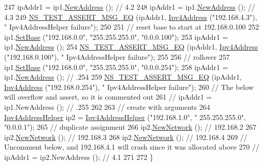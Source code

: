 \begin{DoxyCode}
247   ipAddr1 = ip1.\hyperlink{classns3_1_1Ipv4AddressHelper_a9d6bc3cd8def204f9c253fce666b2edd}{NewAddress} (); \textcolor{comment}{// 4.2}
248   ipAddr1 = ip1.\hyperlink{classns3_1_1Ipv4AddressHelper_a9d6bc3cd8def204f9c253fce666b2edd}{NewAddress} (); \textcolor{comment}{// 4.3}
249   \hyperlink{group__testing_ga2a9d78cffb3db8e867c35fff0b698cf5}{NS\_TEST\_ASSERT\_MSG\_EQ} (ipAddr1, \hyperlink{classns3_1_1Ipv4Address}{Ipv4Address} (\textcolor{stringliteral}{"192.168.4.3"}), \textcolor{stringliteral}{"
      Ipv4AddressHelper failure"});
250 
251   \textcolor{comment}{// reset base to start at 192.168.0.100}
252   ip1.\hyperlink{classns3_1_1Ipv4AddressHelper_acf7b16dd25bac67e00f5e25f90a9a035}{SetBase} (\textcolor{stringliteral}{"192.168.0.0"}, \textcolor{stringliteral}{"255.255.255.0"}, \textcolor{stringliteral}{"0.0.0.100"});
253   ipAddr1 = ip1.\hyperlink{classns3_1_1Ipv4AddressHelper_a9d6bc3cd8def204f9c253fce666b2edd}{NewAddress} ();
254   \hyperlink{group__testing_ga2a9d78cffb3db8e867c35fff0b698cf5}{NS\_TEST\_ASSERT\_MSG\_EQ} (ipAddr1, \hyperlink{classns3_1_1Ipv4Address}{Ipv4Address} (\textcolor{stringliteral}{"192.168.0.100"}), \textcolor{stringliteral}{"
      Ipv4AddressHelper failure"});
255   
256   \textcolor{comment}{// rollover}
257   ip1.\hyperlink{classns3_1_1Ipv4AddressHelper_acf7b16dd25bac67e00f5e25f90a9a035}{SetBase} (\textcolor{stringliteral}{"192.168.0.0"}, \textcolor{stringliteral}{"255.255.255.0"}, \textcolor{stringliteral}{"0.0.0.254"});
258   ipAddr1 = ip1.\hyperlink{classns3_1_1Ipv4AddressHelper_a9d6bc3cd8def204f9c253fce666b2edd}{NewAddress} (); \textcolor{comment}{// .254}
259   \hyperlink{group__testing_ga2a9d78cffb3db8e867c35fff0b698cf5}{NS\_TEST\_ASSERT\_MSG\_EQ} (ipAddr1, \hyperlink{classns3_1_1Ipv4Address}{Ipv4Address} (\textcolor{stringliteral}{"192.168.0.254"}), \textcolor{stringliteral}{"
      Ipv4AddressHelper failure"});
260   \textcolor{comment}{// The below will overflow and assert, so it is commented out}
261   \textcolor{comment}{// ipAddr1 = ip1.NewAddress (); // .255}
262 
263   \textcolor{comment}{// create with arguments}
264   \hyperlink{classns3_1_1Ipv4AddressHelper}{Ipv4AddressHelper} ip2 = \hyperlink{classns3_1_1Ipv4AddressHelper}{Ipv4AddressHelper} (\textcolor{stringliteral}{"192.168.1.0"}, \textcolor{stringliteral}{"
      255.255.255.0"}, \textcolor{stringliteral}{"0.0.0.1"});
265   \textcolor{comment}{// duplicate assignment}
266   ip2.\hyperlink{classns3_1_1Ipv4AddressHelper_a3277d133ef0d2669934a16a8206ba8e4}{NewNetwork} ();  \textcolor{comment}{// 192.168.2}
267   ip2.\hyperlink{classns3_1_1Ipv4AddressHelper_a3277d133ef0d2669934a16a8206ba8e4}{NewNetwork} ();  \textcolor{comment}{// 192.168.3}
268   ip2.\hyperlink{classns3_1_1Ipv4AddressHelper_a3277d133ef0d2669934a16a8206ba8e4}{NewNetwork} ();  \textcolor{comment}{// 192.168.4}
269   \textcolor{comment}{// Uncomment below, and 192.168.4.1 will crash since it was allocated above}
270   \textcolor{comment}{// ipAddr1 = ip2.NewAddress (); // 4.1}
271 
272 \}
\end{DoxyCode}


